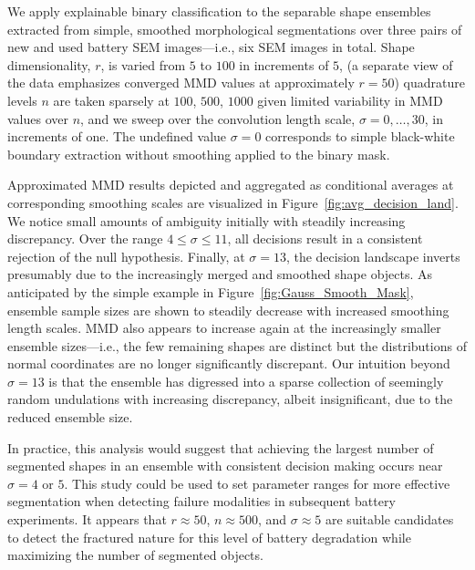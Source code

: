 \documentclass[pdflatex,iicol]{sn-jnl}%
\theoremstyle{thmstyleone}%
\theoremstyle{thmstyletwo}%
\theoremstyle{thmstylethree}%
\begin{document}
We apply explainable binary classification to the separable shape ensembles extracted from simple, smoothed morphological segmentations over three pairs of new and used battery SEM images---i.e., six SEM images in total. Shape dimensionality, $r$, is varied from $5$ to $100$ in increments of $5$, (a separate view of the data emphasizes converged MMD values at approximately $r=50$) quadrature levels $n$ are taken sparsely at $100$, $500$, $1000$ given limited variability in MMD values over $n$, and we sweep over the convolution length scale, $\sigma=0,\dots,30$, in increments of one. The undefined value $\sigma = 0$ corresponds to simple black-white boundary extraction without smoothing applied to the binary mask. 

Approximated MMD results depicted and aggregated as conditional averages at corresponding smoothing scales are visualized in Figure~\ref{fig:avg_decision_land}. We notice small amounts of ambiguity initially with steadily increasing discrepancy. Over the range $4\leq \sigma \leq 11$, all decisions result in a consistent rejection of the null hypothesis. Finally, at $\sigma = 13$, the decision landscape inverts presumably due to the increasingly merged and smoothed shape objects. As anticipated by the simple example in Figure~\ref{fig:Gauss_Smooth_Mask}, ensemble sample sizes are shown to steadily decrease with increased smoothing length scales. MMD also appears to increase again at the increasingly smaller ensemble sizes---i.e., the few remaining shapes are distinct but the distributions of normal coordinates are no longer significantly discrepant. Our intuition beyond $\sigma =13$ is that the ensemble has digressed into a sparse collection of seemingly random undulations with increasing discrepancy, albeit insignificant, due to the reduced ensemble size.

In practice, this analysis would suggest that achieving the largest number of segmented shapes in an ensemble with consistent decision making occurs near $\sigma = 4$ or $5$. This study could be used to set parameter ranges for more effective segmentation when detecting failure modalities in subsequent battery experiments. It appears that $r\approx 50$, $n\approx500$, and $\sigma \approx 5$ are suitable candidates to detect the fractured nature for this level of battery degradation while maximizing the number of segmented objects.
\end{document}
